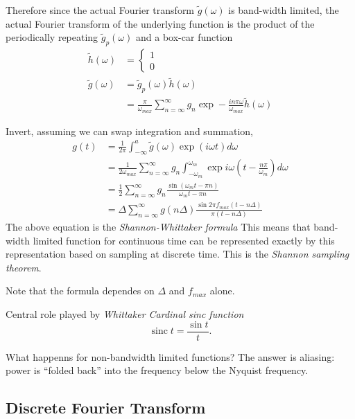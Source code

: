 \documentclass[a4paper]{article}
\newcommand*{\ft}{\tilde}
\DeclareMathOperator{\sinc}{sinc}
\begin{document}
Therefore since the actual Fourier transform \(\ft g(\omega)\) is band-width limited, the actual Fourier transform of the underlying function is the product of the periodically repeating \(\ft g_p(\omega)\) and a box-car function
\begin{align*}
  \ft h(\omega) &=
                  \begin{cases}
                    1 & \\
                    0 &
                  \end{cases}
  \\
  \ft g(\omega) &= \ft g_p(\omega) \ft h(\omega) \\
                &= \frac{\pi}{\omega_{max}} \sum_{n = \infty}^{\infty} g_n \exp - \frac{in\pi \omega}{\omega_{max}} \ft h(\omega)
\end{align*}

Invert, assuming we can swap integration and summation,
\begin{align*}
  g(t) &= \frac{1}{2\pi} \int_{-\infty}^{a} \ft g(\omega) \exp(i\omega t) d\omega \\
       &= \frac{1}{2\omega_{max}} \sum_{n = \infty}^{\infty} g_n \int_{-\omega_m}^{\omega_m} \exp i\omega(t - \frac{n\pi}{\omega_m}) d\omega \\
       &= \frac{1}{2} \sum_{n = \infty}^{\infty} g_n \frac{\sin (\omega_m t - \pi n)}{\omega_m t - \pi n} \\
       &= \Delta \sum_{n = \infty}^{\infty} g(n \Delta) \frac{\sin 2\pi f_{max} (t - n\Delta)}{\pi (t - n\Delta)}
\end{align*}
The above equation is the \emph{Shannon-Whittaker formula} This means that band-width limited function for continuous time can be represented exactly by this representation based on sampling at discrete time. This is the \emph{Shannon sampling theorem}.

Note that the formula dependes on \(\Delta\) and \(f_{max}\) alone.

Central role played by \emph{Whittaker Cardinal sinc function}
\[
  \sinc t = \frac{\sin t}{t}.
\]

What happenns for non-bandwidth limited functions? The answer is aliasing: power is ``folded back'' into the frequency below the Nyquist frequency.

\subsection{Discrete Fourier Transform}
\end{document}

